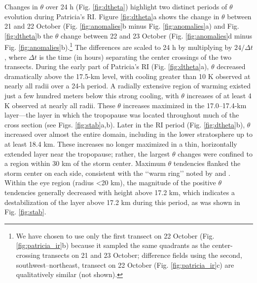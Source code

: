 Changes in $\theta$ over 24 h (Fig. \ref{fig:dtheta}) highlight two distinct periods of $\theta$ evolution during Patricia’s RI.
Figure \ref{fig:dtheta}a shows the change in $\theta$ between 21 and 22 October (Fig. \ref{fig:anomalies}b minus Fig. \ref{fig:anomalies}a) and Fig. \ref{fig:dtheta}b the $\theta$ change between 22 and 23 October (Fig. \ref{fig:anomalies}d minus Fig. \ref{fig:anomalies}b).\footnote{We have chosen to use only the first transect on 22 October (Fig. \ref{fig:patricia_ir}b) because it sampled the same quadrants as the center-crossing transects on 21 and 23 October; difference fields using the second, southwest--northeast, transect on 22 October (Fig. \ref{fig:patricia_ir}c) are qualitatively similar (not shown).}
The differences are scaled to 24 h by multiplying by $24/\Delta t$, where $\Delta t$
is the time (in hours) separating the center crossings of the two transects.
During the early part of Patricia’s RI (Fig. \ref{fig:dtheta}a), $\theta$ decreased dramatically above the 17.5-km level, with cooling greater than 10 K observed at nearly all radii over a 24-h period.
A radially extensive region of warming existed just a few hundred meters below this strong cooling, with $\theta$ increases of at least 4 K observed at nearly all radii.
These $\theta$ increases maximized in the 17.0--17.4-km layer---the layer in which the tropopause was located throughout much of the cross section (see Figs. \ref{fig:stab}a,b).
Later in the RI period (Fig. \ref{fig:dtheta}b), $\theta$ increased over almost the entire domain, including in the lower stratosphere up to at least 18.4 km.
These increases no longer maximized in a thin, horizontally extended layer near the tropopause; rather, the largest $\theta$ changes were confined to a region within 30 km of the storm center.
Maximum $\theta$ tendencies flanked the storm center on each side, consistent with the ‘‘warm ring’’ noted by \cite{Schubertetal2007} and \cite{SternZhang2013}.
Within the eye region (radius <20 km), the magnitude of the positive $\theta$ tendencies generally decreased with height above 17.2 km, which indicates a destabilization of the layer above 17.2 km during this period, as was shown in Fig. \ref{fig:stab}.

